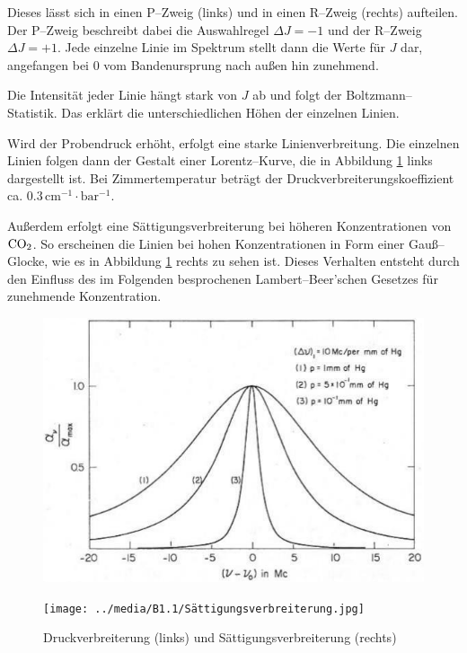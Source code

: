\documentclass[12pt,a4paper]{scrartcl}
\numberwithin{equation}{section} %
\begin{document}
Dieses lässt sich in einen P--Zweig (links) und in einen R--Zweig (rechts) aufteilen. Der P--Zweig beschreibt dabei die Auswahlregel $\Delta J = -1$ und der R--Zweig $\Delta J = +1$. Jede einzelne Linie im Spektrum stellt dann die Werte für $J$ dar, angefangen bei $0$ vom Bandenursprung nach außen hin zunehmend.

Die Intensität jeder Linie hängt stark von $J$ ab und folgt der Boltzmann--Statistik. Das erklärt die unterschiedlichen Höhen der einzelnen Linien.

Wird der Probendruck erhöht, erfolgt eine starke Linienverbreitung. Die einzelnen Linien folgen dann der Gestalt einer Lorentz--Kurve, die in Abbildung \ref{abb:Druckverbreiterung & Sättigungsverbreiterung} links dargestellt ist. Bei Zimmertemperatur beträgt der Druckverbreiterungskoeffizient ca. $0.3 \mathrm{\, cm^{-1}\cdot bar^{-1}}$. \cite{UzK}

Außerdem erfolgt eine Sättigungsverbreiterung bei höheren Konzentrationen von $\ce{CO_2}$. So erscheinen die Linien bei hohen Konzentrationen in Form einer Gauß--Glocke, wie es in Abbildung \ref{abb:Druckverbreiterung & Sättigungsverbreiterung} rechts zu sehen ist. Dieses Verhalten entsteht durch den Einfluss des im Folgenden besprochenen Lambert--Beer'schen Gesetzes für zunehmende Konzentration.

\begin{figure}[h]
	\centering
	\begin{minipage}{0.49\textwidth}
		\includegraphics[width=\textwidth]{../media/B1.1/Druckverbreiterung.jpg}
	\end{minipage}
	\begin{minipage}{0.49\textwidth}
		\texttt{[image: ../media/B1.1/Sättigungsverbreiterung.jpg]}
	\end{minipage}
	\caption{Druckverbreiterung (links) und Sättigungsverbreiterung (rechts) \cite{UzK}}
	\label{abb:Druckverbreiterung & Sättigungsverbreiterung}
\end{figure}
\end{document}
